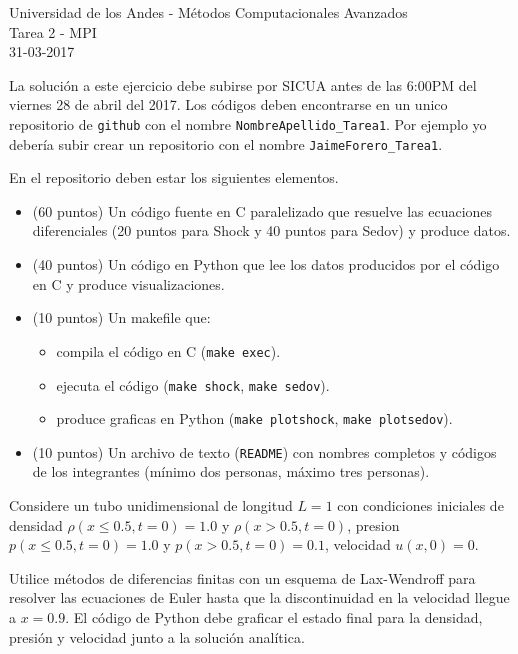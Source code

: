\documentclass[11pt,letterpaper]{exam}
\begin{document}
\begin{center}
{\Large Universidad de los Andes - M\'etodos Computacionales Avanzados} \\
Tarea 2 - \textsc{MPI}\\
31-03-2017\\
\end{center}

\vspace{0.3cm}


\noindent
La soluci\'on a este ejercicio debe subirse por SICUA antes de las 6:00PM
del viernes 28 de abril del 2017. 
Los c\'odigos deben encontrarse en un unico repositorio de \verb'github'
con el nombre \verb"NombreApellido_Tarea1". Por ejemplo yo deber\'ia
subir crear un repositorio con el nombre \verb"JaimeForero_Tarea1". 

\noindent
En el repositorio deben estar los siguientes elementos.
\begin{itemize}
\item (60 puntos) Un c\'odigo fuente en C paralelizado que resuelve
  las ecuaciones diferenciales (20 puntos para Shock y 40 puntos para
  Sedov) y produce datos.  
\item (40 puntos) Un c\'odigo en Python que lee los datos producidos por el
  c\'odigo en C y produce visualizaciones.
\item (10 puntos) Un makefile que:
\begin{itemize}
\item compila el c\'odigo en C (\verb"make exec").
\item ejecuta el c\'odigo (\verb"make shock", \verb"make sedov").
\item produce graficas en Python (\verb"make plotshock", \verb"make plotsedov").
\end{itemize}
\item (10 puntos) Un archivo de texto (\verb"README") con nombres completos y c\'odigos de los integrantes (m\'inimo dos personas, m\'aximo tres personas).
\end{itemize}

\vspace{0.3cm}

\begin{questions}

Considere un tubo unidimensional de longitud $L=1$ con condiciones
iniciales de densidad $\rho(x\leq 0.5,t=0)=1.0$ y $\rho(x>0.5,t=0)$,
presion $p(x\leq0.5, t=0)=1.0$ y $p(x>0.5,t=0)=0.1$, velocidad
$u(x,0)=0$.

Utilice m\'etodos de diferencias finitas con un esquema de
Lax-Wendroff para resolver las ecuaciones de Euler hasta que la
discontinuidad en la velocidad llegue a $x=0.9$. El c\'odigo de Python
debe graficar el estado final para la densidad, presi\'on y velocidad
junto a la soluci\'on anal\'itica.



\end{questions}
\end{document}
